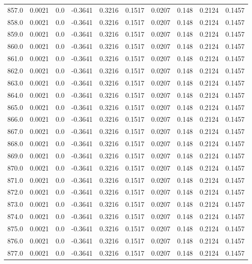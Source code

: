 \begin{longtable}{lrrrrrrrrr}
857.0 & 0.0021 & 0.0 & -0.3641 & 0.3216 & 0.1517 & 0.0207 & 0.148 & 0.2124 & 0.1457 \\
858.0 & 0.0021 & 0.0 & -0.3641 & 0.3216 & 0.1517 & 0.0207 & 0.148 & 0.2124 & 0.1457 \\
859.0 & 0.0021 & 0.0 & -0.3641 & 0.3216 & 0.1517 & 0.0207 & 0.148 & 0.2124 & 0.1457 \\
860.0 & 0.0021 & 0.0 & -0.3641 & 0.3216 & 0.1517 & 0.0207 & 0.148 & 0.2124 & 0.1457 \\
861.0 & 0.0021 & 0.0 & -0.3641 & 0.3216 & 0.1517 & 0.0207 & 0.148 & 0.2124 & 0.1457 \\
862.0 & 0.0021 & 0.0 & -0.3641 & 0.3216 & 0.1517 & 0.0207 & 0.148 & 0.2124 & 0.1457 \\
863.0 & 0.0021 & 0.0 & -0.3641 & 0.3216 & 0.1517 & 0.0207 & 0.148 & 0.2124 & 0.1457 \\
864.0 & 0.0021 & 0.0 & -0.3641 & 0.3216 & 0.1517 & 0.0207 & 0.148 & 0.2124 & 0.1457 \\
865.0 & 0.0021 & 0.0 & -0.3641 & 0.3216 & 0.1517 & 0.0207 & 0.148 & 0.2124 & 0.1457 \\
866.0 & 0.0021 & 0.0 & -0.3641 & 0.3216 & 0.1517 & 0.0207 & 0.148 & 0.2124 & 0.1457 \\
867.0 & 0.0021 & 0.0 & -0.3641 & 0.3216 & 0.1517 & 0.0207 & 0.148 & 0.2124 & 0.1457 \\
868.0 & 0.0021 & 0.0 & -0.3641 & 0.3216 & 0.1517 & 0.0207 & 0.148 & 0.2124 & 0.1457 \\
869.0 & 0.0021 & 0.0 & -0.3641 & 0.3216 & 0.1517 & 0.0207 & 0.148 & 0.2124 & 0.1457 \\
870.0 & 0.0021 & 0.0 & -0.3641 & 0.3216 & 0.1517 & 0.0207 & 0.148 & 0.2124 & 0.1457 \\
871.0 & 0.0021 & 0.0 & -0.3641 & 0.3216 & 0.1517 & 0.0207 & 0.148 & 0.2124 & 0.1457 \\
872.0 & 0.0021 & 0.0 & -0.3641 & 0.3216 & 0.1517 & 0.0207 & 0.148 & 0.2124 & 0.1457 \\
873.0 & 0.0021 & 0.0 & -0.3641 & 0.3216 & 0.1517 & 0.0207 & 0.148 & 0.2124 & 0.1457 \\
874.0 & 0.0021 & 0.0 & -0.3641 & 0.3216 & 0.1517 & 0.0207 & 0.148 & 0.2124 & 0.1457 \\
875.0 & 0.0021 & 0.0 & -0.3641 & 0.3216 & 0.1517 & 0.0207 & 0.148 & 0.2124 & 0.1457 \\
876.0 & 0.0021 & 0.0 & -0.3641 & 0.3216 & 0.1517 & 0.0207 & 0.148 & 0.2124 & 0.1457 \\
877.0 & 0.0021 & 0.0 & -0.3641 & 0.3216 & 0.1517 & 0.0207 & 0.148 & 0.2124 & 0.1457 \\

\end{longtable}
